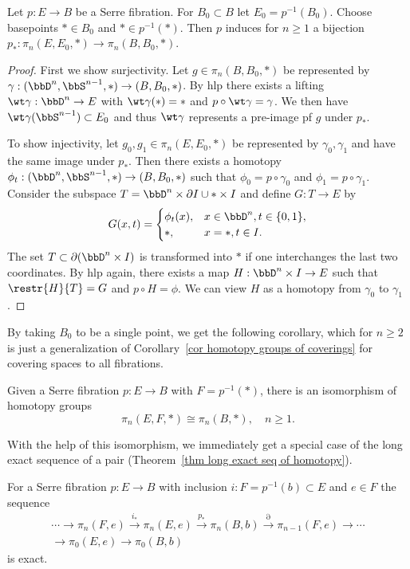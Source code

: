 \begin{thm}\label{thm 6.3.1 tomDieck}
    Let $p:E\to B$ be a Serre fibration. For $B_0\subset B$ let $E_0=p^{-1}(B_0)$. Choose basepoints $*\in B_0$ and $* \in p^{-1}(*)$. Then $p$ induces for $n\geq 1$ a bijection $p_\ast:\pi_n(E,E_0,*)\to \pi_n(B,B_0,*)$.
\end{thm}
\begin{proof}
    First we show surjectivity. Let $g \in \pi_n(B,B_0,*)$ be represented by $\gamma:(\bbD^n,\bbS^{n-1},*)\to (B,B_0,*)$.
    By \gls{hlp} there exists a lifting $\wt\gamma:\bbD^n\to E$ with $\wt\gamma(*)=*$ and $p\circ \wt\gamma=\gamma$. We then have $\wt\gamma(\bbS^{n-1})\subset E_0$ and thus $\wt\gamma$ represents a pre-image pf $g$ under $p_\ast$.

    To show injectivity, let $g_0,g_1\in \pi_n(E,E_0,*)$ be represented by $\gamma_0,\gamma_1$ and have the same image under $p_\ast$. Then there exists a homotopy $\phi_t:(\bbD^n,\bbS^{n-1},*)\to (B,B_0,*)$ such that $\phi_0=p\circ \gamma_0$ and $\phi_1=p\circ \gamma_1$. Consider the subspace $T=\bbD^n\times\partial I\cup *\times I$ and define $G:T\to E$ by 
    \[G(x,t)=
        \begin{cases}
            \phi_t(x),& x\in \bbD^n, t\in\{0,1\},\\
            *, & x=*, t\in I.
        \end{cases}
    \]
    The set $T\subset \partial(\bbD^n\times I)$ is transformed into $*$ if one interchanges the last two coordinates. By \gls{hlp} again, there exists a map $H:\bbD^n\times I\to E$ such that $\restr{H}{T}=G$ and $p\circ H=\phi$. We can view $H$ as a homotopy from $\gamma_0$ to $\gamma_1$.
\end{proof}
By taking $B_0$ to be a single point, we get the following corollary, which for $n\geq 2$ is just a generalization of Corollary~\ref{cor homotopy groups of coverings} for covering spaces to all fibrations.
\begin{cor}
    Given a Serre fibration $p:E\to B$ with $F=p^{-1}(*)$, there is an isomorphism of homotopy groups
    \[\pi_n(E,F,*)\cong \pi_n(B,*),\quad n\geq 1.\]
\end{cor}
With the help of this isomorphism, we immediately get a special case of the long exact sequence of a pair (Theorem~\ref{thm long exact seq of homotopy}).
\begin{thm}
    For a Serre fibration $p:E\to B$ with inclusion $i:F=p^{-1}(b)\subset E$ and $e\in F$ the sequence
    \begin{multline}
        \cdots \to \pi_n(F,e)\overset{i_\ast}{\to}\pi_n(E,e)\overset{p_\ast}{\to}\pi_n(B,b)\overset{\partial}{\to}\pi_{n-1}(F,e)\to\cdots\\ 
        \to \pi_0(E,e)\to \pi_0(B,b)
    \end{multline}
    is exact.
\end{thm}

